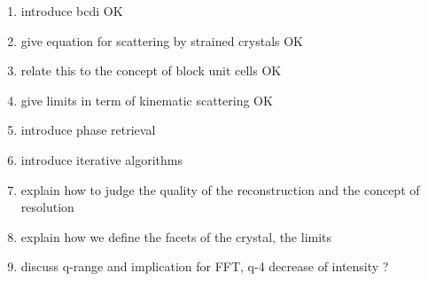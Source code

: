 \begin{enumerate}
    \item introduce bcdi OK
    \item give equation for scattering by strained crystals OK
    \item relate this to the concept of block unit cells OK
    \item give limits in term of kinematic scattering OK
    \item introduce phase retrieval
    \item introduce iterative algorithms
    \item explain how to judge the quality of the reconstruction and the concept of resolution
    \item explain how we define the facets of the crystal, the limits
    \item discuss q-range and implication for FFT, q-4 decrease of intensity ?
\end{enumerate}